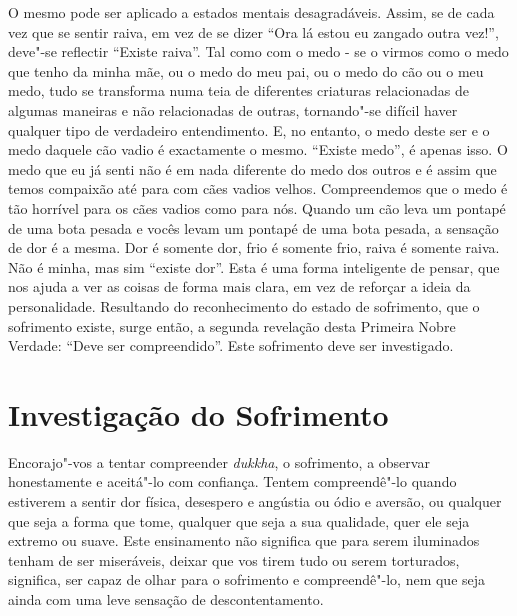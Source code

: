 O mesmo pode ser aplicado a estados mentais desagradáveis. Assim, se de cada vez
que se sentir raiva, em vez de se dizer “Ora lá estou eu zangado outra vez!”,
deve"-se reflectir “Existe raiva”. Tal como com o medo - se o virmos como o medo
que tenho da minha mãe, ou o medo do meu pai, ou o medo do cão ou o meu medo,
tudo se transforma numa teia de diferentes criaturas relacionadas de algumas
maneiras e não relacionadas de outras, tornando"-se difícil haver qualquer tipo
de verdadeiro entendimento. E, no entanto, o medo deste ser e o medo daquele cão
vadio é exactamente o mesmo. “Existe medo”, é apenas isso. O medo que eu já
senti não é em nada diferente do medo dos outros e é assim que temos compaixão
até para com cães vadios velhos. Compreendemos que o medo é tão horrível para os
cães vadios como para nós. Quando um cão leva um pontapé de uma bota pesada e
vocês levam um pontapé de uma bota pesada, a sensação de dor é a mesma. Dor é
somente dor, frio é somente frio, raiva é somente raiva. Não é minha, mas sim
“existe dor”. Esta é uma forma inteligente de pensar, que nos ajuda a ver as
coisas de forma mais clara, em vez de reforçar a ideia da personalidade.
Resultando do reconhecimento do estado de sofrimento, que o sofrimento existe,
surge então, a segunda revelação desta Primeira Nobre Verdade: “Deve ser
compreendido”. Este sofrimento deve ser investigado.

\section{Investigação do Sofrimento}

Encorajo"-vos a tentar compreender \emph{dukkha}, o sofrimento, a observar
honestamente e aceitá"-lo com confiança. Tentem compreendê"-lo quando estiverem a
sentir dor física, desespero e angústia ou ódio e aversão, ou qualquer que seja
a forma que tome, qualquer que seja a sua qualidade, quer ele seja extremo ou
suave. Este ensinamento não significa que para serem iluminados tenham de ser
miseráveis, deixar que vos tirem tudo ou serem torturados, significa, ser capaz
de olhar para o sofrimento e compreendê"-lo, nem que seja ainda com uma leve
sensação de descontentamento.

